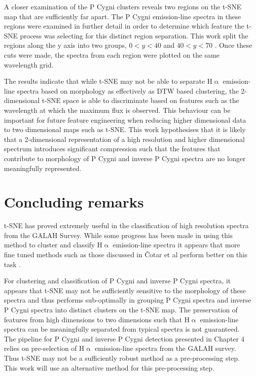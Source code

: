 A closer examination of the P Cygni clusters reveals two regions on the t-SNE map that are sufficiently far apart. The P Cygni emission-line spectra in these regions were examined in further detail in order to determine which feature the t-SNE process was selecting for this distinct region separation. This work split the regions along the y axis into two groups, $0<y<40$ and $40<y<70$ . Once these cuts were made, the spectra from each region were plotted on the same wavelength grid. 

The results indicate that while t-SNE may not be able to separate H$\upalpha$ emission-line spectra based on morphology as effectively as DTW based clustering, the 2-dimensional t-SNE space is able to discriminate based on features such as the wavelength at which the maximum flux is observed. This behaviour can be important for future feature engineering when reducing higher dimensional data to two dimensional maps such as t-SNE. This work hypothesises that it is likely that a 2-dimensional representation of a high resolution and higher dimensional spectrum introduces significant compression such that the features that contribute to morphology of P Cygni and inverse P Cygni spectra are no longer meaningfully represented.

\section{Concluding remarks}

t-SNE has proved extremely useful in the classification of high resolution spectra from the GALAH Survey. While some progress has been made in using this method to cluster and classify H$\upalpha$ emission-line spectra \citep{traven2017galah} it appears that more fine tuned methods such as those discussed in Čotar et al perform better on this task \citep{vcotar2021galah}.

For clustering and classification of P Cygni and inverse P Cygni spectra, it appears that t-SNE may not be sufficiently sensitive to the morphology of these spectra and thus performs sub-optimally in grouping P Cygni spectra and inverse P Cygni spectra into distinct clusters on the t-SNE map. The preservation of features from high dimensions to two dimensions such that H$\upalpha$ emission-line spectra can be meaningfully separated from typical spectra is not guaranteed. The pipeline for P Cygni and inverse P Cygni detection presented in Chapter 4 relies on pre-selection of H$\upalpha$ emission-line spectra from the GALAH survey. Thus t-SNE may not be a sufficiently robust method as a pre-processing step. This work will use an alternative method for this pre-processing step.

